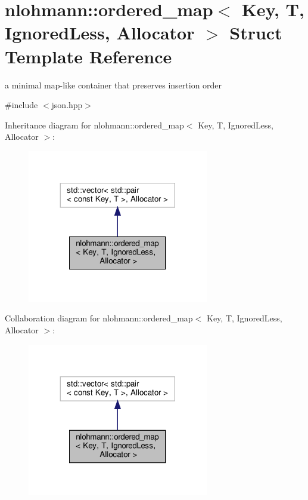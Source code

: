 \hypertarget{structnlohmann_1_1ordered__map}{}\section{nlohmann\+:\+:ordered\+\_\+map$<$ Key, T, Ignored\+Less, Allocator $>$ Struct Template Reference}
\label{structnlohmann_1_1ordered__map}


a minimal map-\/like container that preserves insertion order  




{\ttfamily \#include $<$json.\+hpp$>$}



Inheritance diagram for nlohmann\+:\+:ordered\+\_\+map$<$ Key, T, Ignored\+Less, Allocator $>$\+:
\nopagebreak
\begin{figure}[H]
\begin{center}
\leavevmode
\includegraphics[width=224pt]{structnlohmann_1_1ordered__map__inherit__graph}
\end{center}
\end{figure}


Collaboration diagram for nlohmann\+:\+:ordered\+\_\+map$<$ Key, T, Ignored\+Less, Allocator $>$\+:
\nopagebreak
\begin{figure}[H]
\begin{center}
\leavevmode
\includegraphics[width=224pt]{structnlohmann_1_1ordered__map__coll__graph}
\end{center}
\end{figure}
